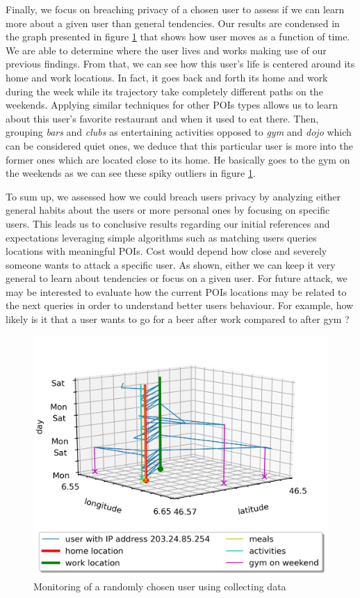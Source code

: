 \documentclass[10pt,conference,compsocconf]{IEEEtran}
\begin{document}
Finally, we focus on breaching privacy of a chosen user to assess if we can learn more about a given user than general tendencies. Our results are condensed in the graph presented in figure \ref{random_fig} that shows how user moves as a function of time. We are able to determine where the user lives and works making use of our previous findings. From that, we can see how this user's life is centered around its home and work locations. In fact, it goes back and forth its home and work during the week while its trajectory take completely different paths on the weekends. Applying similar techniques for other POIs types allows us to learn about this user's favorite restaurant and when it used to eat there. Then, grouping \textit{bars} and \textit{clubs} as entertaining activities opposed to \textit{gym} and \textit{dojo} which can be considered quiet ones, we deduce that this particular user is more into the former ones which are located close to its home. He basically goes to the gym on the weekends as we can see these spiky outliers in figure \ref{random_fig}.

To sum up, we assessed how we could breach users privacy by analyzing either general habits about the users or more personal ones by focusing on specific users. This leads us to conclusive results regarding our initial references and expectations leveraging simple algorithms such as matching users queries locations with meaningful POIs. Cost would depend how close and severely someone wants to attack a specific user. As shown, either we can keep it very general to learn about tendencies or focus on a given user. For future attack, we may be interested to evaluate how the current POIs locations may be related to the next queries in order to understand better users behaviour. For example, how likely is it that a user wants to go for a beer after work compared to after gym ?

\begin{figure}
  \includegraphics[width=\columnwidth]{random.png}
  \caption{Monitoring of a randomly chosen user using collecting data}
  \label{random_fig}
\end{figure}
\end{document}
